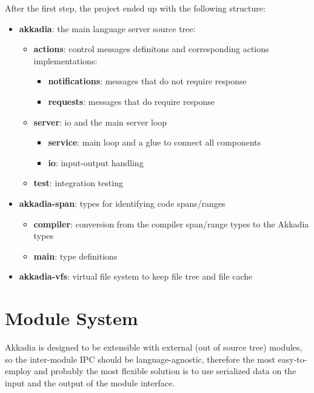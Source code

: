 After the first step, the project ended up with the following structure:
\begin{itemize}
    \item{
        \textbf{akkadia}: the main language server source tree:
        \begin{itemize}
        \item{
            \textbf{actions}: control messages definitons and corresponding actions implementations:
            \begin{itemize}
            \item{\textbf{notifications}: messages that do not require response}
            \item{\textbf{requests}: messages that do require response}
            \end{itemize}
        }
        \item{
            \textbf{server}: io and the main server loop
            \begin{itemize}
            \item{\textbf{service}: main loop and a glue to connect all components}
            \item{\textbf{io}: input-output handling}
            \end{itemize}
        }
        \item{\textbf{test}: integration testing}
        \end{itemize}
    }
    \item{
        \textbf{akkadia-span}: types for identifying code spans/ranges
        \begin{itemize}
        \item{\textbf{compiler}: conversion from the compiler span/range types to the Akkadia types}
        \item{\textbf{main}: type definitions}
        \end{itemize}
    }
    \item{
        \textbf{akkadia-vfs}: virtual file system to keep file tree and file cache
    }
\end{itemize}

\section{Module System}
Akkadia is designed to be extensible with external (out of source tree) modules,
so the inter-module IPC should be language-agnostic, therefore the most easy-to-employ and probably
the most flexible solution is to use serialized data on the input and the output of the module interface.

